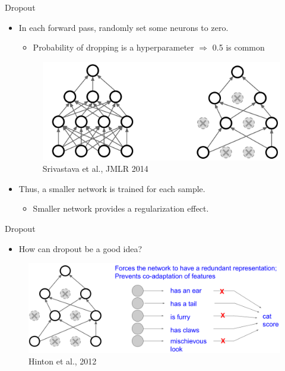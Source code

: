 \documentclass[serif, aspectratio=169]{beamer}
\begin{document}
\begin{frame}{Dropout}
	\begin{itemize}
		\item In each forward pass, randomly set some neurons to zero.
		\begin{itemize}
			\item Probability of dropping is a hyperparameter $\Rightarrow$ 0.5 is common
		\end{itemize}
		\begin{figure}[htpb]
			\begin{center}
				\includegraphics[keepaspectratio, scale=0.15]{pic/dropout}
				\caption*{\scriptsize Srivastava et al., JMLR 2014}
			\end{center}
		\end{figure}
		\vspace{-1em}
		\item Thus, a smaller network is trained for each sample.
		\begin{itemize}
			\item Smaller network provides a regularization effect.
		\end{itemize}
	\end{itemize}
\end{frame}

\begin{frame}{Dropout}
	\begin{itemize}
		\item How can dropout be a good idea?
	\end{itemize}
	\begin{figure}[htpb]
		\begin{center}
			\includegraphics[keepaspectratio, scale=0.15]{pic/dropout2}
			\caption*{\scriptsize Hinton et al., 2012}
		\end{center}
	\end{figure}
\end{frame}
\end{document}
